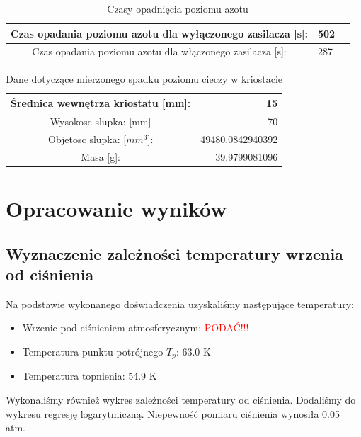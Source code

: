 \documentclass{article}
\begin{document}
\begin{table}[h!tbp]
\centering
\begin{tabular}{|c|l|r|}
\hline
Czas opadania poziomu azotu dla wyłączonego zasilacza [s]: & 502 \\ \hline
Czas opadania poziomu azotu dla włączonego zasilacza [s]:& 287 \\ \hline
\end{tabular}
\caption{Czasy opadnięcia poziomu azotu}
\label{}
\end{table}

\begin{table}[h!tbp]
\centering
\begin{tabular}{|c|l|l|r|}
\hline
\multicolumn{ 3}{|c|}{Średnica wewnętrza kriostatu [mm]:} & 15 \\ \hline
\multicolumn{ 3}{|c|}{Wysokosc slupka: [mm]} & 70 \\ \hline
\multicolumn{ 3}{|c|}{Objetosc slupka: [$mm^3$]:} & 49480.0842940392 \\ \hline
\multicolumn{ 3}{|c|}{Masa [g]:} & 39.9799081096 \\ \hline
\end{tabular}
\caption{Dane dotyczące mierzonego spadku poziomu cieczy w kriostacie}
\label{}
\end{table}




\section{Opracowanie wyników}
\subsection{Wyznaczenie zależności temperatury wrzenia od ciśnienia}
Na podstawie wykonanego doświadczenia uzyskaliśmy następujące temperatury:
\begin{itemize}
\item Wrzenie pod ciśnieniem atmosferycznym: \textcolor{red}{PODAĆ!!!}
\item Temperatura punktu potrójnego $T_{p}$: 63.0 K
\item Temperatura topnienia: 54.9 K
\end{itemize}

Wykonaliśmy również wykres zależności temperatury od ciśnienia. Dodaliśmy do wykresu regresję logarytmiczną. Niepewność pomiaru ciśnienia wynosiła 0.05 atm.
\end{document}
